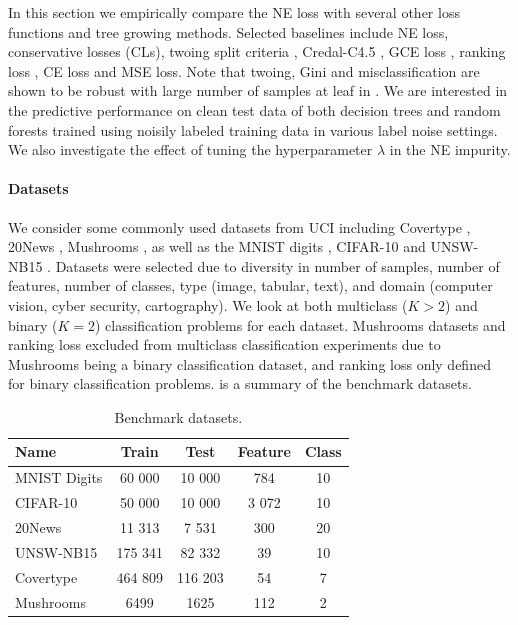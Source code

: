 \documentclass[letterpaper]{article} %
\begin{document}
In this section we empirically compare the NE loss with several other loss functions and tree growing methods. Selected baselines include 
NE loss, 
conservative losses (CLs), 
twoing split criteria \cite{breiman1984classification}, 
Credal-C4.5 \cite{mantas2014credal}, 
GCE loss \cite{zhang2018generalized}, 
ranking loss \cite{yang2019robust}, 
CE loss and MSE loss.
Note that twoing, Gini and misclassification are shown to be robust with large number of samples at leaf in \cite{ghosh2017robustness}.
We are interested in the predictive performance on clean test data of both
decision trees and random forests trained using noisily labeled training data in
various label noise settings. 
We also investigate the effect of tuning the hyperparameter $\lambda$ in the NE impurity. 

\paragraph{Datasets} 
We consider some commonly used datasets from UCI including Covertype \cite{misc_covertype_31}, 20News \cite{lang1995newsweeder}, Mushrooms \cite{misc_mushroom_73}, as well as the MNIST digits \cite{lecun1998gradient}, CIFAR-10 \cite{krizhevsky2009learning} and UNSW-NB15 \cite{moustafa2015unsw}. 
Datasets were selected due to diversity in number of samples, number of features, number of classes, type (image, tabular, text), and domain (computer vision, cyber security, cartography).
We look at both multiclass ($K>2$) and binary ($K=2$) classification problems for each dataset. Mushrooms datasets and ranking loss excluded from multiclass classification experiments due to Mushrooms being a binary classification dataset, and ranking loss only defined for binary classification problems. 
 is a summary of the benchmark datasets.


\begin{table}[t]
    \centering
    \begin{tabular}{lcccc}
        Name & Train & Test & Feature & Class  \\\hline
         MNIST Digits & 60 000 & 10 000 & 784 & 10 \\
         CIFAR-10 & 50 000 & 10 000 & 3 072 & 10 \\
         20News & 11 313 & 7 531 & 300 & 20 \\
         UNSW-NB15 & 175 341 & 82 332 & 39 & 10 \\
         Covertype & 464 809 & 116 203 & 54 & 7 \\
         Mushrooms & 6499 & 1625 & 112 & 2
    \end{tabular}
    \caption{Benchmark datasets.}
    \label{tab:datasets}
\end{table}
\end{document}
